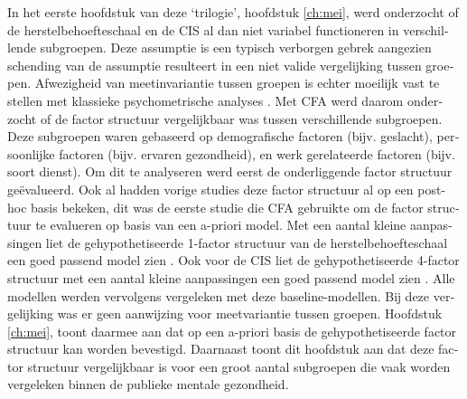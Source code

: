 \begin{otherlanguage}{dutch}
In het eerste hoofdstuk van deze `trilogie', hoofdstuk \ref{ch:mei}, werd onderzocht of de herstelbehoefteschaal en de CIS al dan niet variabel functioneren in verschillende subgroepen. Deze assumptie is een typisch verborgen gebrek aangezien schending van de assumptie resulteert in een niet valide vergelijking tussen groepen. Afwezigheid van meetinvariantie tussen groepen is echter moeilijk vast te stellen met klassieke psychometrische analyses \parencite{Vandenberg_2000,Millsap_2011}. Met CFA werd daarom onderzocht of de factor structuur vergelijkbaar was tussen verschillende subgroepen. Deze subgroepen waren gebaseerd op demografische factoren (bijv. geslacht), persoonlijke factoren (bijv. ervaren gezondheid), en werk gerelateerde factoren (bijv. soort dienst). Om dit te analyseren werd eerst de onderliggende factor structuur ge\"evalueerd. Ook al hadden vorige studies deze factor structuur al op een post-hoc basis bekeken, dit was de eerste studie die CFA gebruikte om de factor structuur te evalueren op basis van een a-priori model. Met een aantal kleine aanpassingen liet de gehypothetiseerde 1-factor structuur van de herstelbehoefteschaal een goed passend model zien \parencite{Veldhoven_2008}. Ook voor de CIS liet de gehypothetiseerde 4-factor structuur met een aantal kleine aanpassingen een goed passend model zien \parencite{Janssen_2003}. Alle modellen werden vervolgens vergeleken met deze baseline-modellen. Bij deze vergelijking was er geen aanwijzing voor meetvariantie tussen groepen. Hoofdstuk \ref{ch:mei}, toont daarmee aan dat op een a-priori basis de gehypothetiseerde factor structuur kan worden bevestigd. Daarnaast toont dit hoofdstuk aan dat deze factor structuur vergelijkbaar is voor een groot aantal subgroepen die vaak worden vergeleken binnen de publieke mentale gezondheid.


\end{otherlanguage}
